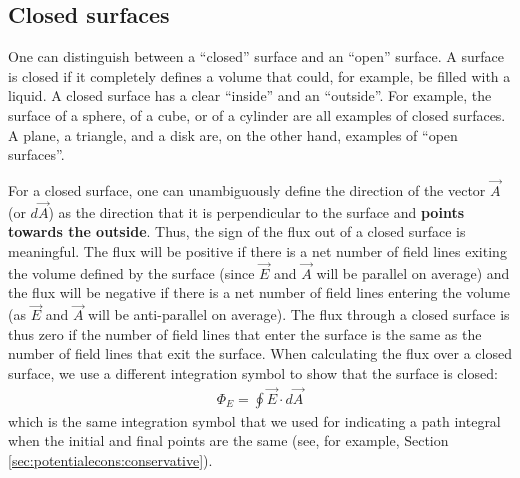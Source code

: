 \subsection{Closed surfaces}
\label{sec:gauss:closedsurfaces}
One can distinguish between a ``closed'' surface and an ``open'' surface. A surface is closed if it completely defines a volume that could, for example, be filled with a liquid.  A closed surface has a clear ``inside'' and an ``outside''. For example, the surface of a sphere, of a cube, or of a cylinder are all examples of closed surfaces. A plane, a triangle, and a disk are, on the other hand, examples of ``open surfaces''.

For a closed surface, one can unambiguously define the direction of the vector $\vec A$ (or $d\vec A$) as the direction that it is perpendicular to the surface and \textbf{points towards the outside}. Thus, the sign of the flux out of a closed surface is meaningful. The flux will be positive if there is a net number of field lines exiting the volume defined by the surface (since $\vec E$ and $\vec A$ will be parallel on average) and the flux will be negative if there is a net number of field lines entering the volume (as $\vec E$ and $\vec A$ will be anti-parallel on average). The flux through a closed surface is thus zero if the number of field lines that enter the surface is the same as the number of field lines that exit the surface. When calculating the flux over a closed surface, we use a different integration symbol to show that the surface is closed:
\begin{align*}
\Phi_E=\oint \vec E\cdot d\vec A
\end{align*}
which is the same integration symbol that we used for indicating a path integral when the initial and final points are the same (see, for example, Section \ref{sec:potentialecons:conservative}).

